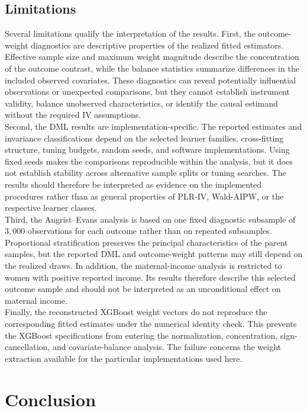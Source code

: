 \documentclass[12pt, a4paper, oneside]{article}
\theoremstyle{plain}
\theoremstyle{definition}
\begin{document}
\subsection{Limitations}
\label{subsec:limitations}

Several limitations qualify the interpretation of the results. First, the
outcome-weight diagnostics are descriptive properties of the realized fitted
estimators. Effective sample size and maximum weight magnitude describe the
concentration of the outcome contrast, while the balance statistics summarize
differences in the included observed covariates. These diagnostics can reveal
potentially influential observations or unexpected comparisons, but they
cannot establish instrument validity, balance unobserved characteristics, or
identify the causal estimand without the required IV assumptions.\\
Second, the DML results are implementation-specific. The reported estimates
and invariance classifications depend on the selected learner families,
cross-fitting structure, tuning budgets, random seeds, and software
implementations. Using fixed seeds makes the comparisons reproducible within
the analysis, but it does not establish stability across alternative sample
splits or tuning searches. The results should therefore be interpreted as
evidence on the implemented procedures rather than as general properties of
PLR-IV, Wald-AIPW, or the respective learner classes.\\
Third, the Angrist--Evans analysis is based on one fixed diagnostic subsample
of \(3{,}000\) observations for each outcome rather than on repeated subsamples. Proportional stratification preserves
the principal characteristics of the parent samples, but the reported DML and
outcome-weight patterns may still depend on the realized draws. In addition,
the maternal-income analysis is restricted to women with positive reported
income. Its results therefore describe this selected outcome sample and
should not be interpreted as an unconditional effect on maternal income.\\
Finally, the reconstructed XGBoost weight vectors do not reproduce the
corresponding fitted estimates under the numerical identity check. This
prevents the XGBoost specifications from entering the normalization,
concentration, sign-cancellation, and covariate-balance analysis. The failure
concerns the weight extraction available for the particular implementations
used here. 



\section{Conclusion}
\label{sec:conclusion}
\end{document}
